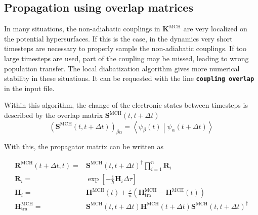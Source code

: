 \documentclass[a4paper,11pt,DIV=15,openany,twoside=false]{scrbook}
\newcommand{\ttmdump}[1]{#1}
\newcommand{\ttt}[1]{\textbf{\texttt{#1}}}
\newcommand{\I}{\ensuremath{\mathrm{i}}}
\newcommand{\VEC}[1]{\ensuremath{\mathbf{#1}}}
\begin{document}
\subsection{Propagation using overlap matrices}

In many situations, the non-adiabatic couplings in $\VEC{K}^{\text{MCH}}$ are very localized on the potential hypersurfaces. If this is the case, in the dynamics very short timesteps are necessary to properly sample the non-adiabatic couplings. If too large timesteps are used, part of the coupling may be missed, leading to wrong population transfer. The local diabatization algorithm gives more numerical stability in these situations. It can be requested with the line \ttt{coupling overlap} in the input file.

Within this algorithm, the change of the electronic states between timesteps is described by the overlap matrix $\VEC{S}^{\text{MCH}}(t,t+\Delta t)$
\begin{equation}
  \left(\VEC{S}^{\text{MCH}}(t,t+\Delta t)\right)_{\beta\alpha}=
  \left\langle
    \psi_\beta(t)
  \middle|
    \psi_\alpha(t+\Delta t)
  \right\rangle
\end{equation}

With this, the propagator matrix can be written as
\ttmdump{
  \begin{align}
    \VEC{R}^{\text{MCH}}(t+\Delta t,t)=&
    \VEC{S}^{\text{MCH}}(t,t+\Delta t)^\dagger\prod\limits_{i=1}^{n}
    \VEC{R}_i\\
    \VEC{R}_i=&
    \exp\left[
        -\frac{\I}{\hbar}\VEC{H}_i\Delta\tau
    \right]\\
    \VEC{H}_i=&
    \VEC{H}^{\text{MCH}}(t) + \frac{i}{n}
    \left(
      \VEC{H}^{\text{MCH}}_{\text{tra}}
      -\VEC{H}^{\text{MCH}}(t)
    \right)\label{eq:ham_propl}\\
    \VEC{H}^{\text{MCH}}_{\text{tra}}=&
      \VEC{S}^{\text{MCH}}(t,t+\Delta t)
      \VEC{H}^{\text{MCH}}(t+\Delta t)
      \VEC{S}^{\text{MCH}}(t,t+\Delta t)^\dagger
  \end{align}
}
\end{document}

